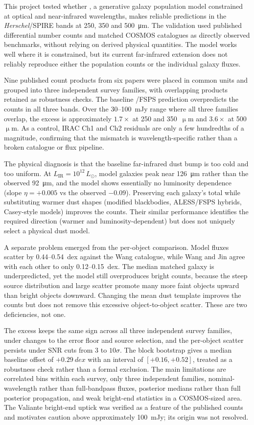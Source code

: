 \documentclass[12pt,a4paper]{article}
\begin{document}
This project tested whether \popcosmos{}, a generative galaxy population model
constrained at optical and near-infrared wavelengths, makes reliable predictions in the
\emph{Herschel}/SPIRE bands at 250, 350 and \SI{500}{\um}. The validation used
published differential number counts and matched COSMOS catalogues as directly observed
benchmarks, without relying on derived physical quantities. The model works well where
it is constrained, but its current far-infrared extension does not reliably reproduce
either the population counts or the individual galaxy fluxes.

Nine published count products from six papers were placed in common units and grouped
into three independent survey families, with overlapping products retained as robustness
checks. The baseline \popcosmos{}/FSPS prediction overpredicts the counts in all three
bands. Over the 30--\SI{100}{mJy} range where all three families overlap, the excess is
approximately $1.7\times$ at 250 and 350~$\upmu$m and $3.6\times$ at 500~$\upmu$m. As a
control, IRAC Ch1 and Ch2 residuals are only a few hundredths of a magnitude, confirming
that the mismatch is wavelength-specific rather than a broken catalogue or flux pipeline.

The physical diagnosis is that the baseline far-infrared dust bump is too cold and too
uniform. At $L_\mathrm{IR} = 10^{12}\,L_\odot$, model galaxies peak near
\SI{126}{\um} rather than the observed \SI{92}{\um}, and the model shows essentially no
luminosity dependence (slope $\eta = +0.005$ vs the observed $-0.09$). Preserving each
galaxy's total \LIR{} while substituting warmer dust shapes (modified blackbodies,
ALESS/FSPS hybrids, Casey-style models) improves the counts. Their similar performance
identifies the required direction (warmer and luminosity-dependent) but does not
uniquely select a physical dust model.

A separate problem emerged from the per-object comparison. Model fluxes scatter by
0.44--\SI{0.54}{dex} against the Wang catalogue, while Wang and Jin agree with each
other to only 0.12--\SI{0.15}{dex}. The median matched galaxy is underpredicted, yet
the model still overproduces bright counts, because the steep source distribution and
large scatter promote many more faint objects upward than bright objects downward.
Changing the mean dust template improves the counts but does not remove this excessive
object-to-object scatter. These are two deficiencies, not one.

The excess keeps the same sign across all three independent survey families, under
changes to the error floor and source selection, and the per-object scatter persists
under SNR cuts from 3 to $10\sigma$. The block bootstrap gives a median baseline offset
of $+\SI{0.29}{dex}$ with an interval of $[+0.16, +0.52]$, treated as a robustness
check rather than a formal exclusion. The main limitations are correlated bins within
each survey, only three independent families, nominal-wavelength rather than
full-bandpass fluxes, posterior medians rather than full posterior propagation, and weak
bright-end statistics in a COSMOS-sized area. The Valiante bright-end uptick was
verified as a feature of the published counts and motivates caution above approximately
\SI{100}{mJy}; its origin was not resolved.
\end{document}
